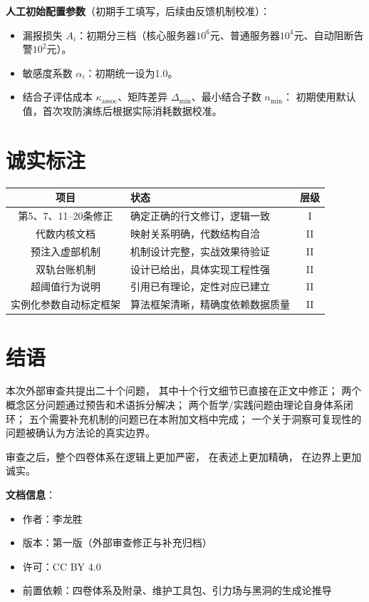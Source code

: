 \documentclass[11pt,a4paper]{article}
\begin{document}
\textbf{人工初始配置参数}（初期手工填写，后续由反馈机制校准）：
\begin{itemize}
    \item 漏报损失 $A_i$：初期分三档（核心服务器$10^6$元、普通服务器$10^4$元、自动阻断告警$10^2$元）。
    \item 敏感度系数 $\alpha_i$：初期统一设为1.0。
    \item 结合子评估成本 $\kappa_{\text{assoc}}$、矩阵差异 $\Delta_{\min}$、最小结合子数 $n_{\min}$：
          初期使用默认值，首次攻防演练后根据实际消耗数据校准。
\end{itemize}

\section{诚实标注}

\begin{center}
\begin{xltabular}{\textwidth}{c|X|c}
\toprule
\textbf{项目} & \textbf{状态} & \textbf{层级} \\
\midrule
第5、7、11--20条修正 & 确定正确的行文修订，逻辑一致 & I \\
代数内核文档 & 映射关系明确，代数结构自洽 & II \\
预注入虚部机制 & 机制设计完整，实战效果待验证 & II \\
双轨台账机制 & 设计已给出，具体实现工程性强 & II \\
超阈值行为说明 & 引用已有理论，定性对应已建立 & II \\
实例化参数自动标定框架 & 算法框架清晰，精确度依赖数据质量 & II \\
\bottomrule
\end{xltabular}
\end{center}

\section{结语}

本次外部审查共提出二十个问题，
其中十个行文细节已直接在正文中修正；
两个概念区分问题通过预告和术语拆分解决；
两个哲学/实践问题由理论自身体系闭环；
五个需要补充机制的问题已在本附加文档中完成；
一个关于洞察可复现性的问题被确认为方法论的真实边界。

审查之后，整个四卷体系在逻辑上更加严密，
在表述上更加精确，
在边界上更加诚实。

\vspace{5mm}
\noindent\textbf{文档信息}：
\begin{itemize}
    \item 作者：李龙胜
    \item 版本：第一版（外部审查修正与补充归档）
    \item 许可：CC BY 4.0
    \item 前置依赖：四卷体系及附录、维护工具包、引力场与黑洞的生成论推导
\end{itemize}
\end{document}
